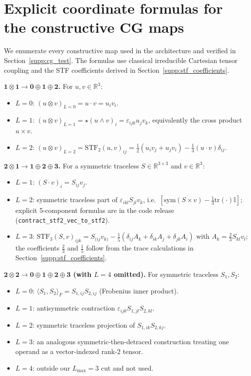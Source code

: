 \section{Explicit coordinate formulas for the constructive CG maps}\label{supp:cg_proof}

We enumerate every constructive map used in the architecture and verified in Section~\ref{supp:cg_test}. The formulas use classical irreducible Cartesian tensor coupling \citep{coope1965irreducible} and the STF coefficients derived in Section~\ref{supp:stf_coefficients}.

\textbf{$\mathbf{1} \otimes \mathbf{1} \to \mathbf{0} \oplus \mathbf{1} \oplus \mathbf{2}$.} For $u, v \in \mathbb{R}^3$:
\begin{itemize}
    \item $L{=}0$: $(u \otimes v)_{L=0} = u \cdot v = u_iv_i$.
    \item $L{=}1$: $(u \otimes v)_{L=1} = \star(u \wedge v)_i = \varepsilon_{ijk}u_jv_k$, equivalently the cross product $u \times v$.
    \item $L{=}2$: $(u \otimes v)_{L=2} = \mathrm{STF}_2(u,v)_{ij} = \tfrac{1}{2}(u_iv_j + u_jv_i) - \tfrac{1}{3}(u\cdot v)\delta_{ij}$.
\end{itemize}

\textbf{$\mathbf{2} \otimes \mathbf{1} \to \mathbf{1} \oplus \mathbf{2} \oplus \mathbf{3}$.} For a symmetric traceless $S \in \mathbb{R}^{3\times 3}$ and $v \in \mathbb{R}^3$:
\begin{itemize}
    \item $L{=}1$: $(S \cdot v)_i = S_{ij}v_j$.
    \item $L{=}2$: symmetric traceless part of $\varepsilon_{ikl}S_{jl}v_k$, i.e.\ $[\mathrm{sym}(S\times v) - \tfrac{1}{3}\mathrm{tr}(\cdot)\mathbb{I}]$; explicit 5-component formulas are in the code release (\texttt{contract\_stf2\_vec\_to\_stf2}).
    \item $L{=}3$: $\mathrm{STF}_3(S, v)_{ijk} = S_{(ij}v_{k)} - \tfrac{1}{5}(\delta_{ij}A_k + \delta_{ik}A_j + \delta_{jk}A_i)$ with $A_k = \tfrac{2}{3}S_{kl}v_l$; the coefficients $\tfrac{2}{3}$ and $\tfrac{1}{5}$ follow from the trace calculations in Section~\ref{supp:stf_coefficients}.
\end{itemize}

\textbf{$\mathbf{2} \otimes \mathbf{2} \to \mathbf{0} \oplus \mathbf{1} \oplus \mathbf{2} \oplus \mathbf{3}$ (with $L{=}4$ omitted).} For symmetric traceless $S_1, S_2$:
\begin{itemize}
    \item $L{=}0$: $\langle S_1, S_2 \rangle_F = S_{1,ij}S_{2,ij}$ (Frobenius inner product).
    \item $L{=}1$: antisymmetric contraction $\varepsilon_{ijk}S_{1,jl}S_{2,kl}$.
    \item $L{=}2$: symmetric traceless projection of $S_{1,ik}S_{2,kj}$.
    \item $L{=}3$: an analogous symmetric-then-detraced construction treating one operand as a vector-indexed rank-2 tensor.
    \item $L{=}4$: outside our $L_{\max}{=}3$ cut and not used.
\end{itemize}

